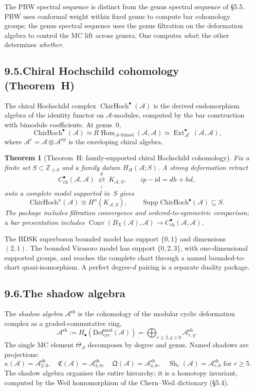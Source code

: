 \documentclass[11pt]{report}
\newtheorem{theorem}{Theorem}[section]
\theoremstyle{definition}
\theoremstyle{remark}
\providecommand{\cA}{\mathcal{A}}
\providecommand{\ChirHoch}{\mathrm{ChirHoch}}
\providecommand{\Defcyc}{\mathrm{Def}_{\mathrm{cyc}}}
\DeclareMathOperator{\Hom}{Hom}
\numberwithin{equation}{section}
\begin{document}
The PBW spectral sequence is distinct from the genus spectral sequence
of \S5.5. PBW uses conformal weight within fixed genus to compute bar
cohomology groups; the genus spectral sequence uses the genus
filtration on the deformation algebra to control the MC lift across
genera. One computes \emph{what}; the other determines \emph{whether}.

\subsection*{9.5.\enspace Chiral Hochschild cohomology (Theorem~H)}

The chiral Hochschild complex $\operatorname{ChirHoch}^\bullet(\cA)$
is the derived endomorphism algebra of the identity functor on
$\cA$-modules, computed by the bar construction with bimodule
coefficients. At genus~$0$,
\[
\operatorname{ChirHoch}^\bullet(\cA)\simeq R\Hom_{\cA\text{-bimod}}(\cA,\cA)\simeq\operatorname{Ext}^\bullet_{\cA^e}(\cA,\cA),
\]
where $\cA^e=\cA\otimes\cA^{\mathrm{op}}$ is the enveloping chiral
algebra.

\begin{theorem}[Theorem~H: family-supported chiral Hochschild
cohomology]\label{thm:track-a-theorem-h}
Fix a finite set \(S\subset\mathbb Z_{\ge0}\) and a family datum
\(H_H(\cA;S)\).  A strong deformation retract
\[
C^\bullet_{\mathrm{ch}}(\cA,\cA)
\ \underset{i}{\overset{p}{\rightleftarrows}}\
K_{\cA,S},
\qquad ip-\mathrm{id}=dh+hd,
\]
onto a complete model supported in~\(S\) gives
\[
\ChirHoch^n(\cA)\cong H^n(K_{\cA,S}),\qquad
\operatorname{Supp}\ChirHoch^\bullet(\cA)\subseteq S.
\]
The package includes filtration convergence and ordered-to-symmetric
comparison; a bar presentation includes
\(\operatorname{Conv}(B_X(\cA),\cA)\to
C^\bullet_{\mathrm{ch}}(\cA,\cA)\).
\end{theorem}

The BDSK superboson bounded model has support \(\{0,1\}\) and
dimensions \((2,1)\).  The bounded Virasoro model has support
\(\{0,2,3\}\), with one-dimensional supported groups, and reaches the
complete chart through a named bounded-to-chart quasi-isomorphism.
A perfect degree-\(d\) pairing is a separate duality package.

\subsection*{9.6.\enspace The shadow algebra}

The \emph{shadow algebra} $\cA^{\mathrm{sh}}$ is the cohomology of the
modular cyclic deformation complex as a graded-commutative ring,
\[
\cA^{\mathrm{sh}}:=H_\bullet(\Defcyc^{\mathrm{mod}}(\cA))=\bigoplus_{r\ge 2,g\ge 0}\cA^{\mathrm{sh}}_{r,g}.
\]
The single MC element $\Theta_\cA$ decomposes by degree and genus.
Named shadows are projections:
\[
\kappa(\cA)=\cA^{\mathrm{sh}}_{2,0},\quad\mathfrak C(\cA)=\cA^{\mathrm{sh}}_{3,0},\quad\mathfrak Q(\cA)=\cA^{\mathrm{sh}}_{4,0},\quad\operatorname{Sh}_r(\cA)=\cA^{\mathrm{sh}}_{r,0}\text{ for }r\ge 5.
\]
The shadow algebra organises the entire hierarchy; it is a homotopy
invariant, computed by the Weil homomorphism of the Chern--Weil
dictionary (\S5.4).
\end{document}
